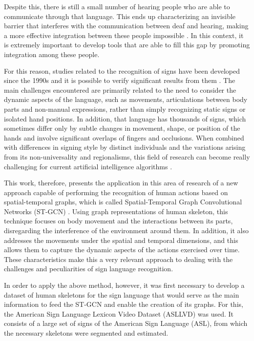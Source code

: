 Despite this, there is still a small number of hearing people who are able to communicate through that language. This ends up characterizing an invisible barrier that interferes with the communication between deaf and hearing, making a more effective integration between these people impossible \cite{peres-2006}. In this context, it is extremely important to develop tools that are able to fill this gap by promoting integration among these people.

For this reason, studies related to the recognition of signs have been developed since the 1990s and it is possible to verify significant results from them \cite{lim-2016, recent-advances-dl-2017}. The main challenges encountered are primarily related to the need to consider the dynamic aspects of the language, such as movements, articulations between body parts and non-manual expressions, rather than simply recognizing static signs or isolated hand positions. In addition, that language has thousands of signs, which sometimes differ only by subtle changes in movement, shape, or position of the hands and involve significant overlaps of fingers and occlusions. When combined with differences in signing style by distinct individuals and the variations arising from its non-universality and regionalisms, this field of research can become really challenging for current artificial intelligence algorithms \cite{konstantinidis-2018}.

This work, therefore, presents the application in this area of research of a new approach capable of performing the recognition of human actions based on spatial-temporal graphs, which is called Spatial-Temporal Graph Convolutional Networks (ST-GCN) \cite {st-gcn-2018}. Using graph representations of human skeleton, this technique focuses on body movement and the interactions between its parts, disregarding the interference of the environment around them. In addition, it also addresses the movements under the spatial and temporal dimensions, and this allows them to capture the dynamic aspects of the actions exercised over time. These characteristics make this a very relevant approach to dealing with the challenges and peculiarities of sign language recognition.

In order to apply the above method, however, it was first necessary to develop a dataset of human skeletons for the sign language that would serve as the main information to feed the ST-GCN and enable the creation of its graphs. For this, the American Sign Language Lexicon Video Dataset (ASLLVD) was used. It consists of a large set of signs of the American Sign Language (ASL), from which the necessary skeletons were segmented and estimated.

